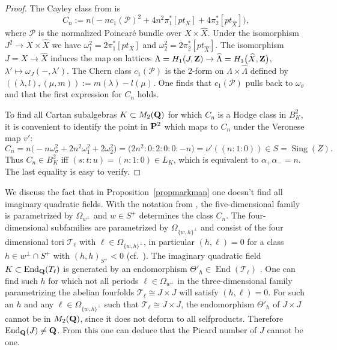 \documentclass[10pt,a4paper]{amsart}
\numberwithin{equation}{section}
\begin{document}
\begin{proof}The Cayley class from \cite[Proposition~11.2]{Markman} is
\[
C_n := n\big({-}nc_1({\mathcal P})^2 + 4n^2\pi_1^*[pt_X] + 4\pi_2^*[pt_{\hat{X}}]\big),
\]
where ${\mathcal P}$ is the normalized Poincar\'e bundle over $X\times\widehat{X}$.
Under the isomorphism $J^2\rightarrow X\times \widehat{X}$ we have $\omega_1^2=2\pi_1^*[pt_X]$
and $\omega_2^2=2\pi_2^*[pt_{\hat{X}}]$.
The isomorphism $J=X\rightarrow \widehat{X}$ induces the map on lattices
$\Lambda=H_1(J,{\bf Z})\rightarrow \widehat{\Lambda}=H_1\big(\widehat{X},{\bf Z}\big)$,
$\lambda'\mapsto \omega_J(-,\lambda')$.
The Chern class $c_1({\mathcal P})$
is the 2-form on $\Lambda\times\widehat{\Lambda}$ defined by
$((\lambda,l),(\mu,m)):=m(\lambda)-l(\mu)$.
One finds that $c_1({\mathcal P})$ pulls back to $\omega_\sigma$ and that the first expression for
$C_n$ holds.

To find all Cartan subalgebras $K\subset M_2({\bf Q})$ for which $C_n$ is a Hodge class in $B^2_K$,
it is convenient to identify the point in ${\bf P}^2$ which maps to $C_n$ under the Veronese map $v'$:
\[
C_n = n\big({-}n\omega_\sigma^2 + 2n^2\omega_1^2 + 2\omega_2^2\big)
 = \big(2n^2:0:2:0:0:-n\big) = \nu'((n:1:0)) \in S = \operatorname{Sing}(Z).
\]
Thus $C_n\in B^2_K$ iff $(s:t:u)=(n:1:0)\in L_K$, which is equivalent to $\alpha_+\alpha_-=n$.
The last equality is easy to verify.
\end{proof}

\begin{Remark}\label{cayT} We discuss the fact that in Proposition~\ref{propmarkman} one doesn't find
all imaginary quadratic fields.
With the notation from \cite[Section~12]{Markman}, the five-dimensional family is pa\-ra\-met\-rized
by $\Omega_{w^\perp}$ and $w\in S^+$ determines the class $C_n$.
The four-dimensional subfamilies are parametrized by $\Omega_{\{w,h\}^\perp}$ and
consist of the four dimensional tori ${\mathcal T}_\ell$ with
$\ell\in \Omega_{\{w,h\}^\perp}$, in particular $(h,\ell)=0$ for a class $h\in w^\perp\cap S^+$ with
$(h,h)_{S^+}<0$ (cf.\ \cite[formula~(12.6), Corollary~12.9]{Markman}). The imaginary quadratic field $K\subset \operatorname{End}_{\bf Q}(T_\ell)$ is generated by an endomorphism $\Theta'_h\in \operatorname{End}({\mathcal T}_\ell)$ \cite[Lemma 12.5]{Markman}.
One can find such $h$ for which not all periods $\ell\in \Omega_{w^\perp}$ in the three-dimensional family parametrizing the abelian fourfolds ${\mathcal T}_\ell\cong J\times J$ will satisfy $(h,\ell)=0$.
For such an $h$ and any $\ell\in\Omega_{\{w,h\}^\perp}$ such that ${\mathcal T}_\ell\cong J\times J$,
the endomorphism $\Theta'_h$ of $J\times J$ cannot be in $M_2({\bf Q})$,
since it does not deform to all selfproducts.
Therefore $\operatorname{End}_{\bf Q}(J)\neq {\bf Q}$. From this one can deduce that the Picard number of $J$ cannot be one.
\end{Remark}
\end{document}
